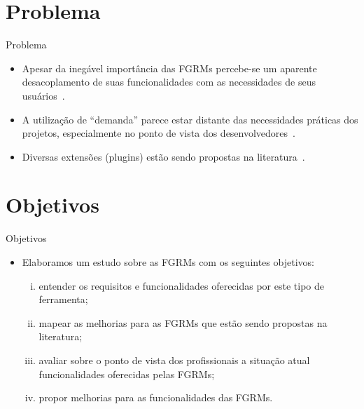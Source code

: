 \documentclass[t,14pt,mathserif]{beamer}
\begin{document}
\section{Problema}

\begin{frame}{Problema}
	\begin{itemize}
        \item Apesar da inegável importância das FGRMs percebe-se um aparente
              desacoplamento de suas funcionalidades com as necessidades de seus
              usuários~\cite{baysal2012qualitative, just2008towards}.
        \item A utilização de  ``demanda'' parece estar distante das
              necessidades práticas dos projetos, especialmente no ponto de vista
              dos desenvolvedores~\cite{Baysal:2013:SAP:2486788.2486957}.
        \item Diversas extensões (plugins) estão sendo propostas na
            literatura~\cite{101186,Thung:2014:BIT:2635868.2661678,Kononenko:2014:DED:2591062.2591075}.
	\end{itemize}
\end{frame}
\section{Objetivos}

\begin{frame}{Objetivos}
	\begin{itemize}
        \item Elaboramos um estudo sobre as FGRMs com os seguintes objetivos:
            \begin{enumerate}[(i)]
                \item entender os requisitos e funcionalidades oferecidas por
                      este tipo de ferramenta;
                \item mapear as melhorias para as FGRMs que estão sendo
                      propostas na literatura;
                \item avaliar sobre o ponto de vista dos profissionais a
                      situação atual funcionalidades oferecidas pelas FGRMs\@;
                \item propor melhorias para as funcionalidades das FGRMs\@.
            \end{enumerate}
	\end{itemize}
\end{frame}
\end{document}
